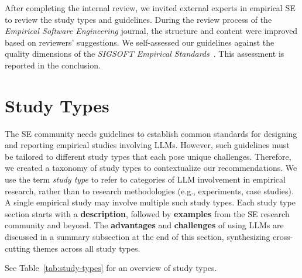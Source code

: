 \documentclass[smallextended]{svjour3}
\newif\ifpaper\papertrue
\begin{document}
After completing the internal review, we invited external experts in empirical SE to review the study types and guidelines.
During the review process of the \emph{Empirical Software Engineering} journal, the structure and content were improved based on reviewers' suggestions.
We self-assessed our guidelines against the quality dimensions of the \emph{SIGSOFT Empirical Standards}~\citep{ralph2021empiricalstandardssoftwareengineering}. This assessment is reported in the conclusion.


\section{Study Types}
\label{sec:study-types}

The SE community needs guidelines to establish common standards for designing and reporting empirical studies involving LLMs.
However, such guidelines must be tailored to different study types that each pose unique challenges.
Therefore, we created a taxonomy of study types to contextualize our recommendations.
We use the term \emph{study type} to refer to categories of LLM involvement in empirical research, rather than to research methodologies (e.g., experiments, case studies). A single empirical study may involve multiple such study types.
Each study type section starts with a \textbf{description}, followed by \textbf{examples} from the SE research community and beyond. The \textbf{advantages} and \textbf{challenges} of using LLMs are discussed in a summary subsection at the end of this section, synthesizing cross-cutting themes across all study types.
\ifpaper
See Table~\ref{tab:study-types} for an overview of study types.
\fi
\space%
\end{document}

